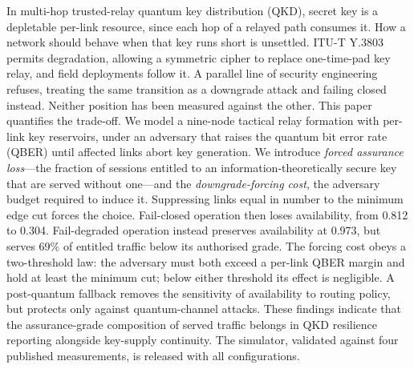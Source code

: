 In multi-hop trusted-relay quantum key distribution (QKD), secret key is a
depletable per-link resource, since each hop of a relayed path consumes it. How a
network should behave when that key runs short is unsettled. ITU-T Y.3803 permits
degradation, allowing a symmetric cipher to replace one-time-pad key relay, and
field deployments follow it. A parallel line of security engineering refuses,
treating the same transition as a downgrade attack and failing closed instead.
Neither position has been measured against the other. This paper quantifies the
trade-off. We model a nine-node tactical relay formation with per-link key
reservoirs, under an adversary that raises the quantum bit error rate (QBER) until
affected links abort key generation. We introduce \emph{forced assurance
loss}---the fraction of sessions entitled to an information-theoretically secure
key that are served without one---and the \emph{downgrade-forcing cost}, the
adversary budget required to induce it. Suppressing links equal in number to the
minimum edge cut forces the choice. Fail-closed operation then loses availability,
from 0.812 to 0.304. Fail-degraded operation instead preserves availability at
0.973, but serves 69\% of entitled traffic below its authorised grade. The forcing
cost obeys a two-threshold law: the adversary must both exceed a per-link QBER
margin and hold at least the minimum cut; below either threshold its effect is
negligible. A post-quantum fallback removes the sensitivity of availability to
routing policy, but protects only against quantum-channel attacks. These findings
indicate that the assurance-grade composition of served traffic belongs in QKD
resilience reporting alongside key-supply continuity. The simulator, validated
against four published measurements, is released with all configurations.
